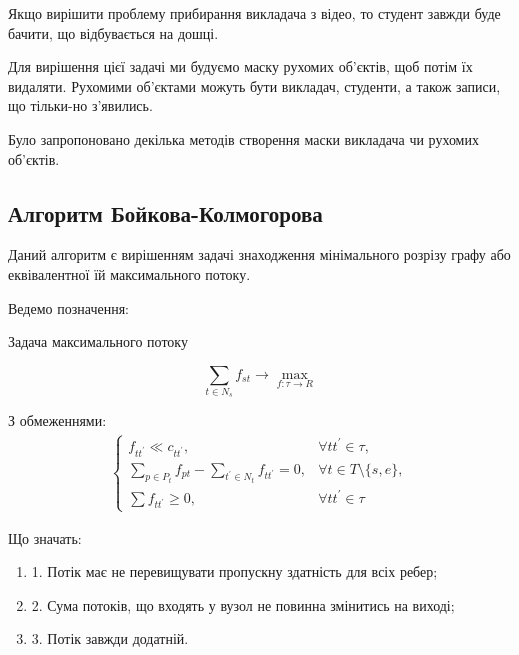 Якщо вирішити проблему прибирання викладача з відео, то студент завжди 
буде бачити, що відбувається на дошці.

Для вирішення цієї задачі ми будуємо маску рухомих об'єктів,
щоб потім їх видаляти. Рухомими об'єктами можуть бути викладач, 
студенти, а також записи, що тільки-но з'явились.

Було запропоновано декілька методів створення маски викладача чи 
рухомих об'єктів.

\subsection{Алгоритм Бойкова-Колмогорова}

Даний алгоритм є вирішенням задачі знаходження мінімального розрізу графу
або еквівалентної їй максимального потоку. 

Ведемо позначення:

Задача максимального потоку

\begin{equation}
    \sum_{t \in N_s} f_{st} \rightarrow \max_{f: \tau \rightarrow R }
\end{equation}

З обмеженнями: 
\begin{equation} 
    \begin{gathered}
        \begin{cases}
            f_{tt^{'}} \ll c_{tt^{'}}, &  \forall tt^{'}  \in \tau , \\

            \sum_{p \in P_t} f_{pt} - \sum_{t^{'} \in N_t} f_{tt^{'}} = 0, & 
            \forall t \in T \setminus \{s,e\}, \\

            \sum f_{tt^{'}} \geq 0, & \forall tt^{'}  \in \tau
        \end{cases}
\end{gathered}
\end{equation}

Що значать:
\begin{enumerate}
    \item 1. Потік має не перевищувати пропускну здатність для всіх ребер;
    \item 2. Сума потоків, що входять у вузол не повинна змінитись на виході;
    \item 3. Потік завжди додатній.
\end{enumerate}

